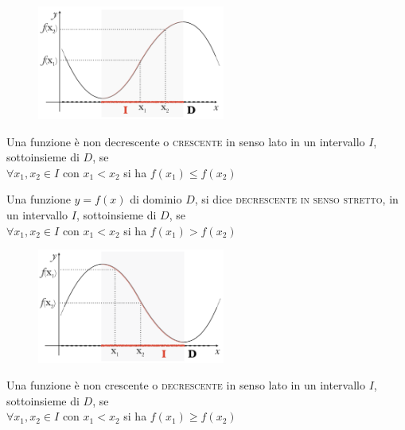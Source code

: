 \begin{figure}[htpb!]
  \centering
  \includegraphics[width=0.55\textwidth]{img/funz_6.png}
\end{figure}
%
\begin{definizione}
Una funzione è non decrescente o \textsc{crescente} in senso lato in un 
intervallo $I$, sottoinsieme di $D$, se\\

$\forall x_1,x_2\in I$  con $x_1<x_2 $ si ha $f(x_1)\leq f(x_2)$\\
%
\end{definizione}
%
%
%

\begin{definizione}
Una funzione $y=f(x)$ di dominio $D$, si dice \textsc{decrescente in senso 
stretto}, in un intervallo $I$, sottoinsieme di $D$, se\\

$\forall x_1,x_2\in I$  con $x_1<x_2 $ si ha $f(x_1)> f(x_2)$\\

\end{definizione}

\begin{figure}[htpb!]
  \centering
  \includegraphics[width=0.55\textwidth]{img/funz_7.png}
\end{figure}
%

\begin{definizione}
Una funzione è non crescente o \textsc{decrescente} in senso lato in un 
intervallo $I$, sottoinsieme di $D$, se\\

$\forall x_1,x_2\in I$  con $x_1<x_2 $ si ha $f(x_1)\geq f(x_2)$\\
\end{definizione}

